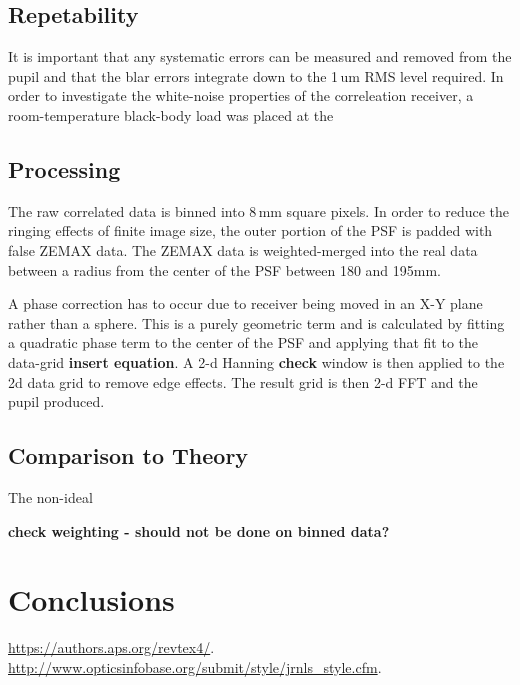 \documentclass[osajnl,twocolumn,showpacs,superscriptaddress,11pt]{revtex4-1} %
\begin{document}
\subsection{Repetability}

It is important that any systematic errors can be measured and removed from the pupil and that the blar errors integrate down to the 1\,um RMS level required. In order to investigate the white-noise properties of the correleation receiver, a room-temperature black-body load was placed at the 


\subsection{Processing}

The raw correlated data is binned into 8\,mm square pixels. In order to reduce the ringing effects of finite image size, the outer portion of the PSF is padded with false ZEMAX data.  The ZEMAX data is weighted-merged into the real data between a radius from the center of the PSF between 180 and 195mm.

A phase correction has to occur due to receiver being moved in an X-Y plane rather than a sphere.  This is a purely geometric term and is calculated by fitting a quadratic phase term to the center of the PSF and applying that fit to the data-grid {\bf insert equation}. A 2-d Hanning {\bf check} window is then applied to the 2d data grid to remove edge effects.  The result grid is then 2-d FFT and the pupil produced. 

\subsection{Comparison to Theory}

The non-ideal

{\bf check weighting - should not be done on binned data?}

\section{Conclusions}

\begin{thebibliography}{99}

 \url{https://authors.aps.org/revtex4/}.
 \url{http://www.opticsinfobase.org/submit/style/jrnls_style.cfm}.

\end{thebibliography}
\end{document}
